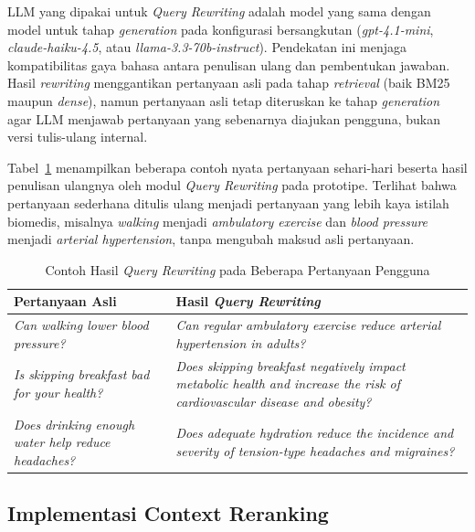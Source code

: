 LLM yang dipakai untuk \textit{Query Rewriting} adalah model yang sama dengan model untuk tahap \textit{generation} pada konfigurasi bersangkutan (\textit{gpt-4.1-mini}, \textit{claude-haiku-4.5}, atau \textit{llama-3.3-70b-instruct}). Pendekatan ini menjaga kompatibilitas gaya bahasa antara penulisan ulang dan pembentukan jawaban. Hasil \textit{rewriting} menggantikan pertanyaan asli pada tahap \textit{retrieval} (baik BM25 maupun \textit{dense}), namun pertanyaan asli tetap diteruskan ke tahap \textit{generation} agar LLM menjawab pertanyaan yang sebenarnya diajukan pengguna, bukan versi tulis-ulang internal.

Tabel~\ref{tbl:qr-contoh} menampilkan beberapa contoh nyata pertanyaan sehari-hari beserta hasil penulisan ulangnya oleh modul \textit{Query Rewriting} pada prototipe. Terlihat bahwa pertanyaan sederhana ditulis ulang menjadi pertanyaan yang lebih kaya istilah biomedis, misalnya \textit{walking} menjadi \textit{ambulatory exercise} dan \textit{blood pressure} menjadi \textit{arterial hypertension}, tanpa mengubah maksud asli pertanyaan.

\begin{table}[H]
\centering
\footnotesize
\setlength{\tabcolsep}{6pt}
\caption{Contoh Hasil \textit{Query Rewriting} pada Beberapa Pertanyaan Pengguna}
\label{tbl:qr-contoh}
\begin{tabular}{p{5.4cm} p{7.6cm}}
\toprule
\textbf{Pertanyaan Asli} & \textbf{Hasil \textit{Query Rewriting}} \\
\midrule
\textit{Can walking lower blood pressure?} & \textit{Can regular ambulatory exercise reduce arterial hypertension in adults?} \\
\addlinespace
\textit{Is skipping breakfast bad for your health?} & \textit{Does skipping breakfast negatively impact metabolic health and increase the risk of cardiovascular disease and obesity?} \\
\addlinespace
\textit{Does drinking enough water help reduce headaches?} & \textit{Does adequate hydration reduce the incidence and severity of tension-type headaches and migraines?} \\
\bottomrule
\end{tabular}
\end{table}

\subsection{Implementasi Context Reranking}
\label{subsec:impl-cr}

